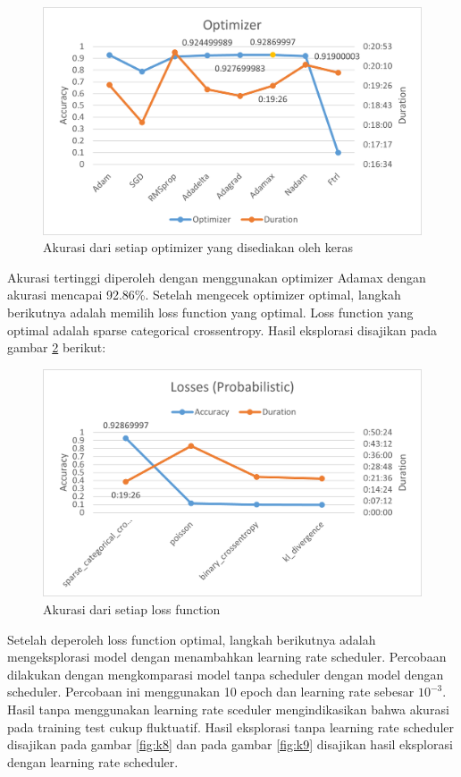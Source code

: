\documentclass[a4, 12px]{article}
\theoremstyle{definition}
\theoremstyle{remark}
\begin{document}
\begin{figure}[!h]
	\centering
	\includegraphics[width=0.7\linewidth]{src/K6}
	\caption{Akurasi dari setiap optimizer yang disediakan oleh keras}
	\label{fig:k6}
\end{figure}
Akurasi tertinggi diperoleh dengan menggunakan optimizer Adamax dengan akurasi mencapai 92.86\%. Setelah mengecek optimizer optimal, langkah berikutnya adalah memilih loss function yang optimal. Loss function yang optimal adalah sparse categorical crossentropy. Hasil eksplorasi disajikan pada gambar \ref{fig:k7} berikut:

\begin{figure}[!h]
	\centering
	\includegraphics[width=0.7\linewidth]{src/K7}
	\caption{Akurasi dari setiap loss function}
	\label{fig:k7}
\end{figure}

Setelah deperoleh loss function optimal, langkah berikutnya adalah mengeksplorasi model dengan menambahkan learning rate scheduler. Percobaan dilakukan dengan mengkomparasi model tanpa scheduler dengan model dengan scheduler. Percobaan ini menggunakan 10 epoch dan learning rate sebesar $10^{-3}$. Hasil tanpa menggunakan learning rate sceduler mengindikasikan bahwa akurasi pada training test cukup fluktuatif. Hasil eksplorasi tanpa learning rate scheduler disajikan pada gambar \ref{fig:k8} dan pada gambar \ref{fig:k9} disajikan hasil eksplorasi dengan learning rate scheduler.
\end{document}
